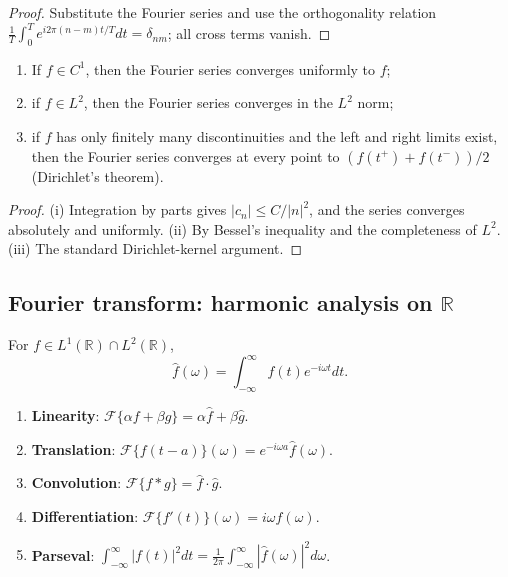 \begin{proof}
Substitute the Fourier series and use the orthogonality relation $\frac{1}{T}\int_0^T e^{i 2\pi (n-m)t / T} dt = \delta_{nm}$; all cross terms vanish.
\end{proof}

\begin{property}\label{prop:fourier_series_convergence}
\begin{enumerate}[label=(\roman*)]
    \item If $f\in C^1$, then the Fourier series converges uniformly to $f$;
    \item if $f\in L^2$, then the Fourier series converges in the $L^2$ norm;
    \item if $f$ has only finitely many discontinuities and the left and right limits exist, then the Fourier series converges at every point to $(f(t^+)+f(t^-))/2$ (Dirichlet's theorem).
\end{enumerate}
\end{property}

\begin{proof}
(i) Integration by parts gives $|c_n|\le C/|n|^2$, and the series converges absolutely and uniformly. (ii) By Bessel's inequality and the completeness of $L^2$. (iii) The standard Dirichlet-kernel argument.
\end{proof}

\subsection{\texorpdfstring{Fourier transform: harmonic analysis on $\mathbb{R}$}{Fourier transform}}

\begin{definition}\label{def:fourier_transform}
For $f \in L^1(\mathbb{R}) \cap L^2(\mathbb{R})$,
\[\hat{f}(\omega) = \int_{-\infty}^{\infty} f(t) e^{-i\omega t} dt.\]
\end{definition}

\begin{property}\label{prop:fourier_properties}
\begin{enumerate}[label=(\roman*)]
    \item \textbf{Linearity}: $\mathcal{F}\{\alpha f + \beta g\} = \alpha \hat{f} + \beta \hat{g}$.
    \item \textbf{Translation}: $\mathcal{F}\{f(t-a)\}(\omega) = e^{-i\omega a}\hat{f}(\omega)$.
    \item \textbf{Convolution}: $\mathcal{F}\{f * g\} = \hat{f} \cdot \hat{g}$.
    \item \textbf{Differentiation}: $\mathcal{F}\{f'(t)\}(\omega) = i\omega \hat{f}(\omega)$.
    \item \textbf{Parseval}: $\int_{-\infty}^{\infty} |f(t)|^2 dt = \frac{1}{2\pi}\int_{-\infty}^{\infty} |\hat{f}(\omega)|^2 d\omega$.
\end{enumerate}
\end{property}


